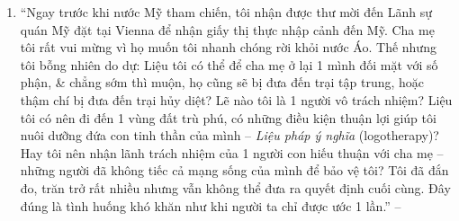 \documentclass[oneside]{book}
\numberwithin{equation}{section}
\begin{document}
\begin{enumerate}[leftmargin=0mm]
	\item ``Ngay trước khi nước Mỹ tham chiến, tôi nhận được thư mời đến Lãnh sự quán Mỹ đặt tại Vienna để nhận giấy thị thực nhập cảnh đến Mỹ. Cha mẹ tôi rất vui mừng vì họ muốn tôi nhanh chóng rời khỏi nước Áo. Thế nhưng tôi bỗng nhiên do dự: Liệu tôi có thể để cha mẹ ở lại 1 mình đối mặt với số phận, \& chẳng sớm thì muộn, họ cũng sẽ bị đưa đến trại tập trung, hoặc thậm chí bị đưa đến trại hủy diệt? Lẽ nào tôi là 1 người vô trách nhiệm? Liệu tôi có nên đi đến 1 vùng đất trù phú, có những điều kiện thuận lợi giúp tôi nuôi dưỡng đứa con tinh thần của mình -- \textit{Liệu pháp ý nghĩa} (logotherapy)? Hay tôi nên nhận lãnh trách nhiệm của 1 người con hiếu thuận với cha mẹ -- những người đã không tiếc cả mạng sống của mình để bảo vệ tôi? Tôi đã đắn đo, trăn trở rất nhiều nhưng vẫn không thể đưa ra quyết định cuối cùng. Đây đúng là tình huống khó khăn như khi người ta chỉ được ước 1 lần.'' -- \cite[p. 14]{Frankl2022}
	

\end{enumerate}
\end{document}
